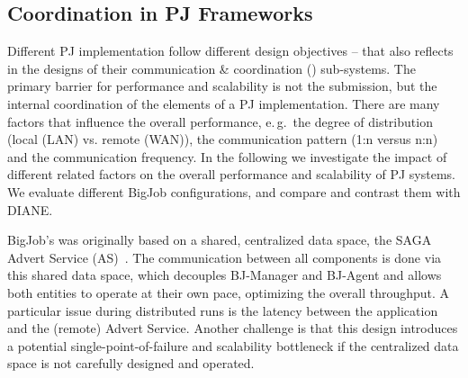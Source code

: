 \documentclass{sig-alternate}
\begin{document}






\subsection{Coordination in PJ Frameworks}
\label{sec:pj_performance}


Different PJ implementation follow different design objectives -- that
also reflects in the designs of their communication \& coordination
(\cc) sub-systems.  The primary barrier for performance and
scalability is not the \cu  submission, but the internal coordination
of the elements of a PJ implementation. There are many factors that
influence the overall performance, e.\,g.\ the degree of distribution
(local (LAN) vs. remote (WAN)), the communication pattern (1:n versus
n:n) and the communication frequency. In the following we investigate
the impact of different \cc related factors on the overall
performance and scalability of PJ systems.  We evaluate different
BigJob configurations, and compare and contrast them with DIANE.

BigJob's \cc was originally based on a shared, centralized data space, 
the SAGA Advert Service (AS)~\cite{saga_advert}.  The
communication between all components is done via this shared data
space, which decouples BJ-Manager and BJ-Agent and allows both
entities to operate at their own pace, optimizing the overall
throughput.  A particular issue during distributed runs is the latency
between the application and the (remote) Advert Service. Another
challenge is that this design introduces a potential
single-point-of-failure and scalability bottleneck if the centralized
data space is not carefully designed and operated.
\end{document}
